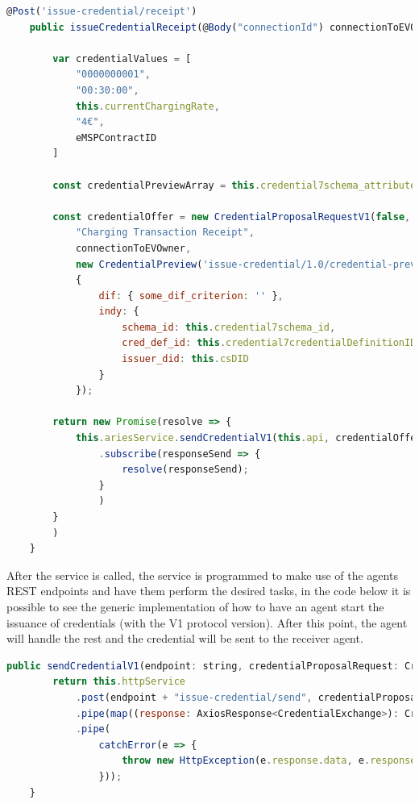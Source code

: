 \begin{lstlisting}[language=JavaScript]
    @Post('issue-credential/receipt')
    public issueCredentialReceipt(@Body("connectionId") connectionToEVOwner: any, @Body("eMSPContractID") eMSPContractID: any): Promise<CredentialExchange> {

        var credentialValues = [
            "0000000001",
            "00:30:00",
            this.currentChargingRate,
            "4€",
            eMSPContractID
        ]

        const credentialPreviewArray = this.credential7schema_attributes.map((key, i) => ({ name: key, value: credentialValues[i] }));

        const credentialOffer = new CredentialProposalRequestV1(false,
            "Charging Transaction Receipt",
            connectionToEVOwner,
            new CredentialPreview('issue-credential/1.0/credential-preview', credentialPreviewArray),
            {
                dif: { some_dif_criterion: '' },
                indy: {
                    schema_id: this.credential7schema_id,
                    cred_def_id: this.credential7credentialDefinitionID,
                    issuer_did: this.csDID
                }
            });

        return new Promise(resolve => {
            this.ariesService.sendCredentialV1(this.api, credentialOffer).pipe()
                .subscribe(responseSend => {
                    resolve(responseSend);
                }
                )
        }
        )
    }
\end{lstlisting}

After the service is called, the service is programmed to make use of the agents REST endpoints and have them perform the desired tasks, in the code below it is possible to see the generic implementation of how to have an agent start the issuance of credentials (with the V1 protocol version). After this point, the agent will handle the rest and the credential will be sent to the receiver agent.

\begin{lstlisting}[language=JavaScript]
        public sendCredentialV1(endpoint: string, credentialProposalRequest: CredentialProposalRequestV1): Observable<CredentialExchange> {
        return this.httpService
            .post(endpoint + "issue-credential/send", credentialProposalRequest)
            .pipe(map((response: AxiosResponse<CredentialExchange>): CredentialExchange => response.data))
            .pipe(
                catchError(e => {
                    throw new HttpException(e.response.data, e.response.status);
                }));
    }
\end{lstlisting}


